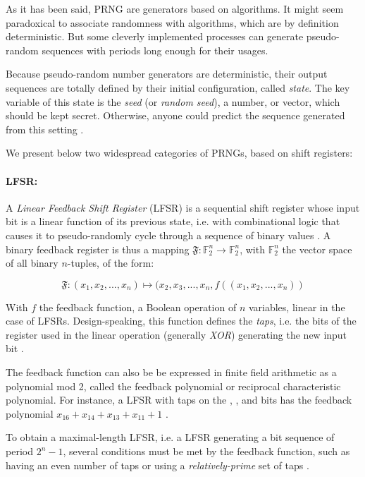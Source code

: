 \documentclass{llncs}
\begin{document}
As it has been said, PRNG are generators based on algorithms. It might seem paradoxical to associate randomness with algorithms, which are by definition deterministic. But some cleverly implemented processes can generate pseudo-random sequences with periods long enough for their usages.

Because pseudo-random number generators are deterministic, their output sequences are totally defined by their initial configuration, called \emph{state}. The key variable of this state is the \emph{seed} (or \emph{random seed}), a number, or vector, which should be kept secret. Otherwise, anyone could predict the sequence generated from this setting \cite{w-rng,down}.

We present below two widespread categories of PRNGs, based on shift registers:


\paragraph{LFSR:}


A \emph{Linear Feedback Shift Register} (LFSR) is a sequential shift register whose input bit is a linear function of its previous state, i.e. with combinational logic that causes it to pseudo-randomly cycle through a sequence of binary values \cite{ray:and,joux}. A binary feedback register is thus a mapping $\mathfrak{F}:\mathbb{F}_2^n \to \mathbb{F}_2^n$, with $\mathbb{F}_2^n$ the vector space of all binary $n$-tuples, of the form:

$$\mathfrak{F}:(x_1, x_2, ..., x_n)\mapsto (x_2, x_3, ..., x_n, f((x_1, x_2, ..., x_n))$$

With $f$ the feedback function, a Boolean operation of $n$ variables, linear in the case of LFSRs. Design-speaking, this function defines the \emph{taps}, i.e. the bits of the register used in the linear operation (generally \textit{XOR}) generating the new input bit \cite{szmi,joux}.

The feedback function can also be be expressed in finite field arithmetic as a polynomial mod 2, called the feedback polynomial or reciprocal characteristic polynomial. For instance, a LFSR with taps on the , ,  and  bits has the feedback polynomial $x_{16} + x_{14} + x_{13} + x_{11} + 1$ \cite{w-lfsr}\cite{joux}.

To obtain a maximal-length LFSR, i.e. a LFSR generating a bit sequence of period $2^n-1$, several conditions must be met by the feedback function, such as having an even number of taps or using a \textit{relatively-prime} set of taps \cite{w-lfsr}\cite{joux}.
\end{document}
